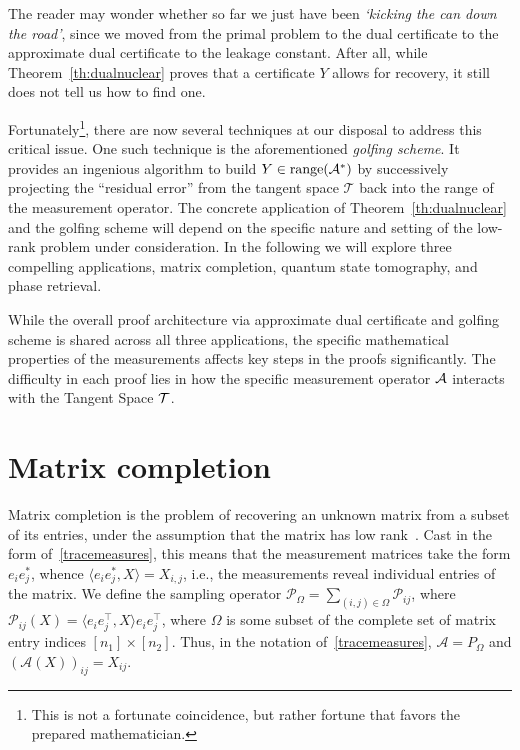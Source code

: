 The reader may wonder whether so far we just have been {\em `kicking the can down the road'}, since we moved from the primal problem to the  dual certificate to the approximate dual certificate to the leakage constant. After all, while Theorem~\ref{th:dualnuclear} proves that a certificate $Y$ allows for recovery, it still does not tell us how to find one. 

Fortunately\footnote{This is not a fortunate coincidence, but rather fortune that favors the prepared mathematician.}, there are now several techniques at our disposal to address this critical issue.
One such technique is the aforementioned {\em golfing scheme}. It provides an ingenious  algorithm to build $Y \in \operatorname{range}(\mathcal{A}^*)$ by successively projecting the ``residual error'' from the tangent space $\mathcal{T}$ back into the range of the measurement operator.
The concrete application of Theorem~\ref{th:dualnuclear} and the golfing scheme will depend on the specific nature and setting of the low-rank problem under consideration. In the following we will explore three compelling applications, matrix completion, quantum state tomography, and phase retrieval. 

While the overall proof architecture via approximate dual certificate and golfing scheme is shared across all three applications, the specific mathematical properties of the measurements affects
key steps in the proofs significantly. The difficulty in each proof lies in how the specific measurement operator ${\mathcal A}$ interacts with the Tangent Space $\mathcal{T}$. 



\section{Matrix completion}\label{s:matrixcompletion}

Matrix completion is the problem of recovering an unknown matrix from a subset of its entries, under the assumption that the matrix has low rank~\cite{CR08,candes2010power}. Cast in the form of~\eqref{tracemeasures}, this means that the measurement matrices take the form $e_{i} e_{j}^{\ast}$, whence  $\langle  e_i e_j^{\ast}, X \rangle = X_{i,j}$, i.e., the measurements reveal individual entries of the matrix.  We define the sampling operator $\mathcal{P}_\Omega = \sum_{(i,j) \in \Omega} \mathcal{P}_{ij}$, where $\mathcal{P}_{ij}(X) = \langle e_i e_j^\top, X \rangle e_i e_j^\top$, where $\Omega$ is some subset of the complete set of matrix entry indices $[n_1] \times [n_2]$. Thus, in the notation of~\eqref{tracemeasures}, ${\mathcal A}=P_{\Omega}$
and $({\mathcal A}(X))_{ij} = X_{ij}$.


